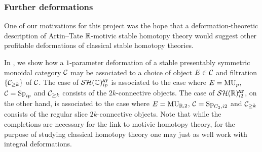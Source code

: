 





\subsubsection{Further deformations}

One of our motivations for this project was the hope that a deformation-theoretic description of Artin--Tate $\mathbb{R}$-motivic stable homotopy theory would suggest other profitable deformations of classical stable homotopy theories.

In , we show how a $1$-parameter deformation of a stable presentably symmetric monoidal category $\mathcal{C}$ may be associated to a choice of object $E \in \mathcal{C}$ and filtration $\{\mathcal{C}_{\geq k}\}$ of $\mathcal{C}$.
The case of $\SHCat$ is associated to the case where $E = \operatorname{\mathrm{MU}}_{p}$, $\mathcal{C} = \operatorname{\mathrm{Sp}}_{ip}$ and $\mathcal{C}_{\geq k}$ consists of the $2k$-connective objects. 
The case of $\SHRat$, on the other hand, is associated to the case where $E = \operatorname{\mathrm{MU}}_{\mathbb{R}, 2}$, $\mathcal{C} = \operatorname{\mathrm{Sp}}_{C_2, i2}$ and $\mathcal{C}_{\geq k}$ consists of the regular slice $2k$-connective objects.
Note that while the completions are necessary for the link to motivic homotopy theory, for the purpose of studying classical homotopy theory one may just as well work with integral deformations.


